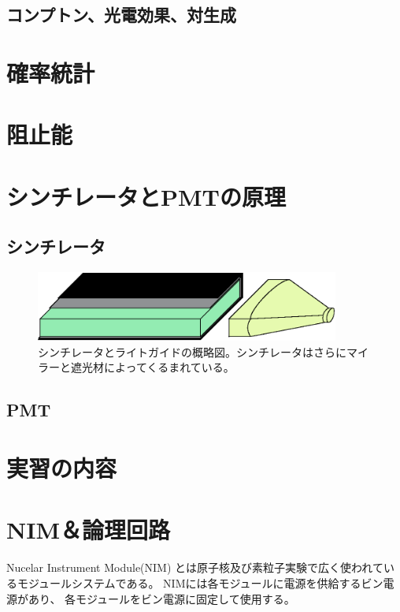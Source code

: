 \documentclass{jarticle}
\begin{document}
  \subsection{コンプトン、光電効果、対生成}
 \section{確率統計}
 \section{阻止能}
 \section{シンチレータとPMTの原理}
  \subsection{シンチレータ}
	  \begin{figure}[H]
	   \begin{center}
	    \includegraphics[width = 100mm]{./picture/Sinti.eps}
	   \end{center}
	   \caption{シンチレータとライトガイドの概略図。シンチレータはさらにマイラーと遮光材によってくるまれている。}
	   \label{Fig:Sinti}
	  \end{figure}
  	  
  \subsection{PMT}
  
 \section{実習の内容}

  
  \clearpage 
  
  \section{NIM＆論理回路}
  Nucelar Instrument Module(NIM) とは原子核及び素粒子実験で広く使われているモジュールシステムである。
  NIMには各モジュールに電源を供給するビン電源があり、
  各モジュールをビン電源に固定して使用する。
  
\end{document}
